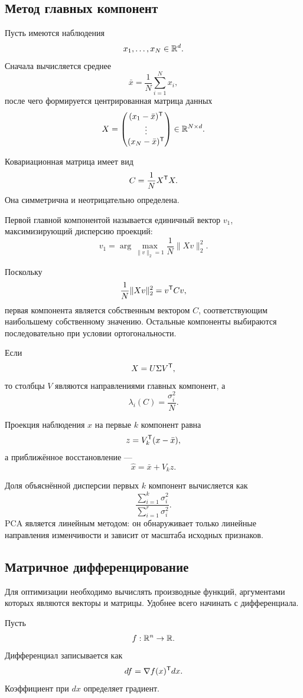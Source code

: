 \subsection{Метод главных компонент}

Пусть имеются наблюдения
\[
x_1,\dots,x_N\in\mathbb{R}^d.
\]
Сначала вычисляется среднее
\[
\bar x
=
\frac1N\sum_{i=1}^{N}x_i,
\]
после чего формируется центрированная матрица данных
\[
X=
\begin{pmatrix}
(x_1-\bar x)^{\mathsf{T}}\\
\vdots\\
(x_N-\bar x)^{\mathsf{T}}
\end{pmatrix}
\in\mathbb{R}^{N\times d}.
\]

Ковариационная матрица имеет вид
\[
C=\frac1N X^{\mathsf{T}}X.
\]
Она симметрична и неотрицательно определена.

\begin{definition}
Первой главной компонентой называется единичный вектор \(v_1\), максимизирующий дисперсию проекций:
\[
v_1
=
\arg\max_{\|v\|_2=1}
\frac1N\|Xv\|_2^2.
\]
\end{definition}

Поскольку
\[
\frac1N\|Xv\|_2^2
=
v^{\mathsf{T}}Cv,
\]
первая компонента является собственным вектором \(C\), соответствующим наибольшему собственному значению. Остальные компоненты выбираются последовательно при условии ортогональности.

Если
\[
X=U\Sigma V^{\mathsf{T}},
\]
то столбцы \(V\) являются направлениями главных компонент, а
\[
\lambda_i(C)=\frac{\sigma_i^2}{N}.
\]

Проекция наблюдения \(x\) на первые \(k\) компонент равна
\[
z=V_k^{\mathsf{T}}(x-\bar x),
\]
а приближённое восстановление ---
\[
\widehat x
=
\bar x+V_kz.
\]

Доля объяснённой дисперсии первых \(k\) компонент вычисляется как
\[
\frac{\sum_{i=1}^{k}\sigma_i^2}
{\sum_{i=1}^{r}\sigma_i^2}.
\]
PCA является линейным методом: он обнаруживает только линейные направления изменчивости и зависит от масштаба исходных признаков.

\subsection{Матричное дифференцирование}

Для оптимизации необходимо вычислять производные функций, аргументами которых являются векторы и матрицы. Удобнее всего начинать с дифференциала.

Пусть
\[
f:\mathbb{R}^n\to\mathbb{R}.
\]
Дифференциал записывается как
\[
df
=
\nabla f(x)^{\mathsf{T}}dx.
\]
Коэффициент при \(dx\) определяет градиент.


